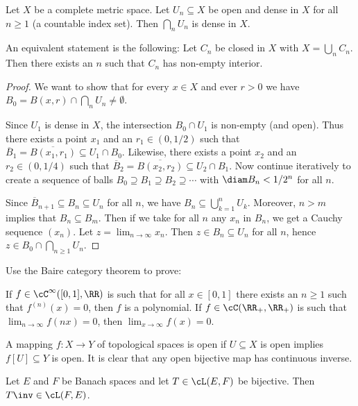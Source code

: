 \begin{thm}
	Let $X$ be a complete metric space.
	Let $U_n \subseteq X$ be open and dense in $X$ for all $n \geq 1$ (a countable index set).
	Then $\bigcap_n U_n$ is dense in $X$.
	
	An equivalent statement is the following:
	Let $C_n$ be closed in $X$ with $X=\bigcup_n C_n$.
	Then there exists an $n$ such that $C_n$ has non-empty interior.
\end{thm}

\begin{proof}
	We want to show that for every $x \in X$ and ever $r>0$ we have $B_0 = B(x,r) \cap \bigcap_n U_n \neq \emptyset$.
	
	Since $U_1$ is dense in $X$, the intersection $B_0 \cap U_1$ is non-empty (and open).
	Thus there exists a point $x_1$ and an $r_1 \in (0,1/2)$ such that $\overline{B}_1 = \overline{B(x_1,r_1)} \subseteq U_1 \cap B_0$.
	Likewise, there exists a point $x_2$ and an $r_2 \in (0,1/4)$ such that $\overline{B}_2 = \overline{B(x_2,r_2)} \subseteq U_2 \cap B_1$.
	Now continue iteratively to create a sequence of balls $B_0 \supseteq B_1 \supseteq B_2 \supseteq \cdots$ with $\diam B_n < 1/2^n$ for all $n$.
	
	Since $\overline{B}_{n+1} \subseteq B_n \subseteq U_n$ for all $n$, we have $B_n \subseteq \bigcup_{k=1}^n U_k$.
	Moreover, $n>m$ implies that $B_n \subseteq B_m$.
	Then if we take for all $n$ any $x_n$ in $B_n$, we get a Cauchy sequence $(x_n)$.
	Let $z  = \lim_{n \to \infty} x_n$.
	Then $z \in B_n \subseteq U_n$ for all $n$, hence $z \in B_0 \cap \bigcap_{n \geq 1} U_n$.
\end{proof}

\begin{exer}
	Use the Baire category theorem to prove:
	\begin{enum}
		\io
		If $f \in \cC^\infty([0,1],\RR)$ is such that for all $x \in [0,1]$ there exists an $n \geq 1$ such that $f^{(n)}(x)=0$, then $f$ is a polynomial.
		\io
		If $f \in \cC(\RR_+,\RR_+)$ is such that $\lim_{n \to \infty} f(nx)=0$, then $\lim_{x \to \infty} f(x) = 0$.
	\end{enum}
\end{exer}

\begin{defn}
	A mapping $f: X \to Y$ of topological spaces is open if $U \subseteq X$ is open implies $f[U] \subseteq Y$ is open.
	It is clear that any open bijective map has continuous inverse.
\end{defn}

\begin{thm}
	Let $E$ and $F$ be Banach spaces and let $T \in \cL(E,F)$ be bijective.
	Then $T\inv \in \cL(F,E)$.
\end{thm}
